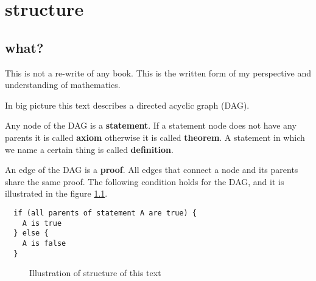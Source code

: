 \documentclass[./main.tex]{subfiles}
\begin{document}
\chapter{structure}
\section{what?}
This is not a re-write of any book.
This is the written form of my perspective and understanding of mathematics.

In big picture this text describes a directed acyclic graph (DAG).

Any node of the DAG is a \textbf{statement}.
If a statement node does not have any parents it is called \textbf{axiom} otherwise it is called \textbf{theorem}.
A statement in which we name a certain thing is called \textbf{definition}.

An edge of the DAG is a \textbf{proof}.
All edges that connect a node and its parents share the same proof.
The following condition holds for the DAG, and it is illustrated in the figure \ref{fig:structure_of_text}.

\begin{center}
\begin{verbatim}
  if (all parents of statement A are true) {
    A is true
  } else {
    A is false
  }
\end{verbatim}
\end{center}

\begin{figure}[h]
	\centering
	\caption{Illustration of structure of this text}
	\label{fig:structure_of_text}
\end{figure}
\end{document}
